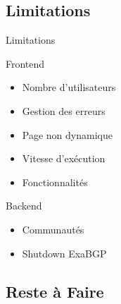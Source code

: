 \subsection{Limitations}
    \begin{frame}{Limitations}
        \begin{block}{Frontend}
            \begin{itemize}
                \item Nombre d'utilisateurs
                \item Gestion des erreurs
                \item Page non dynamique
                \item Vitesse d'exécution
                \item Fonctionnalités
            \end{itemize}
         \end{block}
         \begin{block}{Backend}
            \begin{itemize}
                \item Communautés
                \item Shutdown ExaBGP
            \end{itemize}
         \end{block}

\end{frame}

\subsection{Reste à Faire}

